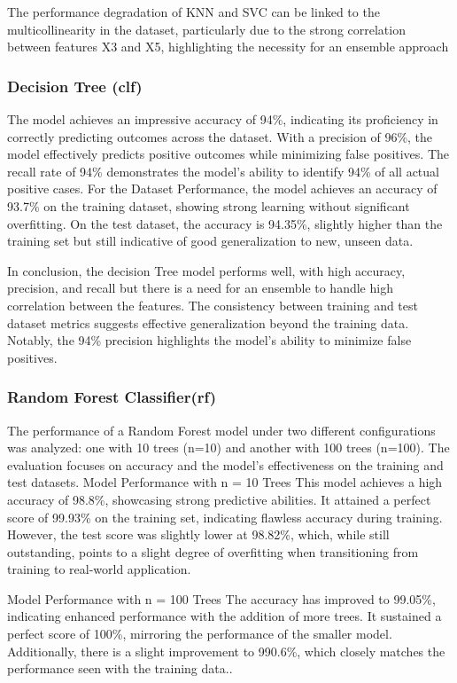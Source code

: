 \documentclass[a4paper]{article}
\begin{document}
The performance degradation of KNN and SVC can be linked to the multicollinearity in the dataset, particularly due to the strong correlation between features X3 and X5, highlighting the necessity for an ensemble approach
\subsubsection{Decision Tree (clf)}

 The model achieves an impressive accuracy of 94\%, indicating its proficiency in correctly predicting outcomes across the dataset.
With a precision of 96\%, the model effectively predicts positive outcomes while minimizing false positives.
The recall rate of 94\% demonstrates the model's ability to identify 94\% of all actual positive cases. For the Dataset Performance, the model achieves an accuracy of 93.7\% on the training dataset, showing strong learning without significant overfitting. On the test dataset, the accuracy is 94.35\%, slightly higher than the training set but still indicative of good generalization to new, unseen data. 

In conclusion, the decision Tree model performs well, with high accuracy, precision, and recall but there is a need for an ensemble to handle high correlation between the features. The consistency between training and test dataset metrics suggests effective generalization beyond the training data. Notably, the 94\% precision highlights the model's ability to minimize false positives.

\subsubsection{Random Forest Classifier(rf)}
 The performance of a Random Forest model under two different configurations was analyzed: one with 10 trees (n=10) and another with 100 trees (n=100). The evaluation focuses on accuracy and the model's effectiveness on the training and test datasets.
 Model Performance with n = 10 Trees
This model achieves a high accuracy of 98.8\%, showcasing strong predictive abilities. It attained a perfect score of 99.93\% on the training set, indicating flawless accuracy during training. However, the test score was slightly lower at 98.82\%, which, while still outstanding, points to a slight degree of overfitting when transitioning from training to real-world application.

 Model Performance with n = 100 Trees
The accuracy has improved to 99.05\%, indicating enhanced performance with the addition of more trees. It sustained a perfect score of 100\%, mirroring the performance of the smaller model. Additionally, there is a slight improvement to 990.6\%, which closely matches the performance seen with the training data..
\end{document}
